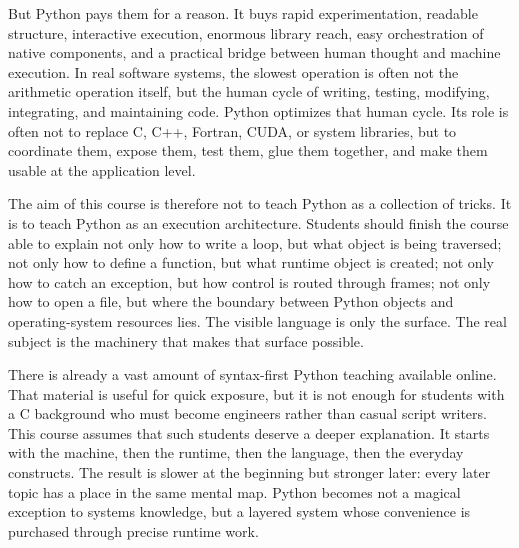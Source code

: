 But Python pays them for a reason. It buys rapid experimentation, readable structure, interactive execution, enormous library reach, easy orchestration of native components, and a practical bridge between human thought and machine execution. In real software systems, the slowest operation is often not the arithmetic operation itself, but the human cycle of writing, testing, modifying, integrating, and maintaining code. Python optimizes that human cycle. Its role is often not to replace C, C++, Fortran, CUDA, or system libraries, but to coordinate them, expose them, test them, glue them together, and make them usable at the application level.

The aim of this course is therefore not to teach Python as a collection of tricks. It is to teach Python as an execution architecture. Students should finish the course able to explain not only how to write a loop, but what object is being traversed; not only how to define a function, but what runtime object is created; not only how to catch an exception, but how control is routed through frames; not only how to open a file, but where the boundary between Python objects and operating-system resources lies. The visible language is only the surface. The real subject is the machinery that makes that surface possible.

There is already a vast amount of syntax-first Python teaching available online. That material is useful for quick exposure, but it is not enough for students with a C background who must become engineers rather than casual script writers. This course assumes that such students deserve a deeper explanation. It starts with the machine, then the runtime, then the language, then the everyday constructs. The result is slower at the beginning but stronger later: every later topic has a place in the same mental map. Python becomes not a magical exception to systems knowledge, but a layered system whose convenience is purchased through precise runtime work.
